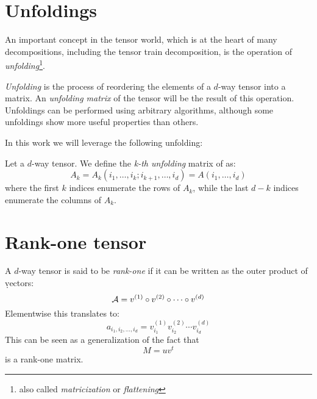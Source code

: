 
\section{Unfoldings}
An important concept in the tensor world, which is at the heart of many decompositions, including the tensor train decomposition, is the operation of \emph{unfolding}\footnote{also called \emph{matricization} or \emph{flattening}}.

\emph{Unfolding} is the process of reordering the elements of a $d$-way tensor into a matrix. An \emph{unfolding matrix} of the tensor will be the result of this operation. Unfoldings can be performed using arbitrary algorithms, although some unfoldings show more useful properties than others.

In this work we will leverage the following unfolding:

\begin{Def}
  Let \A a $d$-way tensor. We define the \emph{k-th unfolding} matrix of \A as:
  \begin{equation} \label{def:unfolding}
    A_k = A_k(i_1,\dots,i_k;i_{k+1},\dots,i_d) = A(i_1,\dots,i_d)
  \end{equation}
where the first $k$ indices enumerate the rows of $A_k$, while the last $d - k$ indices enumerate the columns of $A_k$.
\end{Def}

\section{Rank-one tensor}
A $d$-way tensor \A is said to be \emph{rank-one} if it can be written as the outer product of \d vectors:
\begin{equation}
  \mathcal{A} = v^{(1)} \circ v^{(2)} \circ \cdots \circ v^{(d)}
\end{equation}
Elementwise this translates to:
\begin{equation}
  a_{i_1,i_2,\ldots,i_d} = v_{i_1}^{(1)} v_{i_2}^{(2)} \cdots v_{i_d}^{(d)}
\end{equation}
This can be seen as a generalization of the fact that
\begin{equation*}
  M = u v^t
\end{equation*}
is a rank-one matrix.

